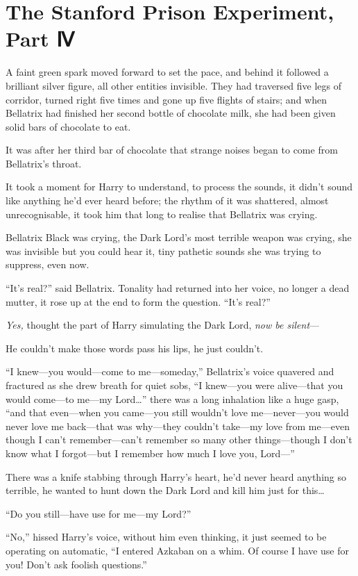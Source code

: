 \chapter{The Stanford Prison Experiment, Part Ⅳ}

A faint green spark moved forward to set the pace, and behind it
followed a brilliant silver figure, all other entities invisible. They
had traversed five legs of corridor, turned right five times and gone up
five flights of stairs; and when Bellatrix had finished her second
bottle of chocolate milk, she had been given solid bars of chocolate to
eat.

It was after her third bar of chocolate that strange noises began to
come from Bellatrix's throat.

It took a moment for Harry to understand, to process the sounds, it
didn't sound like anything he'd ever heard before; the rhythm of it was
shattered, almost unrecognisable, it took him that long to realise that
Bellatrix was crying.

Bellatrix Black was crying, the Dark Lord's most terrible weapon was
crying, she was invisible but you could hear it, tiny pathetic sounds
she was trying to suppress, even now.

``It's real?'' said Bellatrix. Tonality had returned into her voice, no
longer a dead mutter, it rose up at the end to form the question. ``It's
real?''

\emph{Yes,} thought the part of Harry simulating the Dark Lord,
\emph{now be silent}---

He couldn't make those words pass his lips, he just couldn't.

``I knew---you would---come to me---someday,'' Bellatrix's voice
quavered and fractured as she drew breath for quiet sobs, ``I knew---you
were alive---that you would come---to me---my Lord\ldots{}'' there was a
long inhalation like a huge gasp, ``and that even---when you came---you
still wouldn't love me---never---you would never love me back---that was
why---they couldn't take---my love from me---even though I can't
remember---can't remember so many other things---though I don't know
what I forgot---but I remember how much I love you, Lord---''

There was a knife stabbing through Harry's heart, he'd never heard
anything so terrible, he wanted to hunt down the Dark Lord and kill him
just for this\ldots{}

``Do you still---have use for me---my Lord?''

``No,'' hissed Harry's voice, without him even thinking, it just seemed
to be operating on automatic, ``I entered Azkaban on a whim. Of course I
have use for you! Don't ask foolish questions.''

